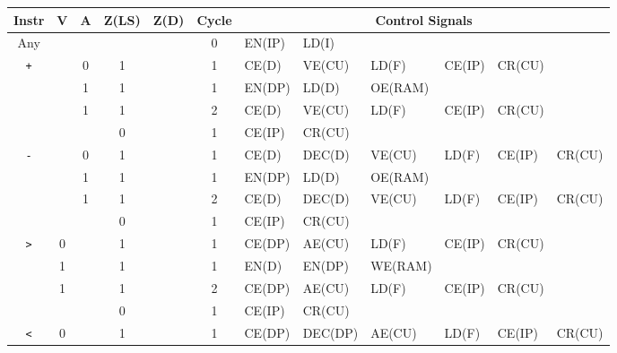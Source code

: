 \begin{landscape}
  \begin{longtable}[c] {c|cccc|c|llllll}
                     Instr        & V & A & Z(LS) & Z(D) & Cycle & \multicolumn{6}{c}{Control Signals}                      \\ \hline
    \rowcolor{White} Any          &   &   &       &      & 0     & EN(IP)   & LD(I)    &         &        &        &        \\ \hline
    \rowcolor{Gray}  \texttt{+}   &   & 0 & 1     &      & 1     & CE(D)    & VE(CU)   & LD(F)   & CE(IP) & CR(CU) &        \\
    \rowcolor{White}              &   & 1 & 1     &      & 1     & EN(DP)   & LD(D)    & OE(RAM) &        &        &        \\
    \rowcolor{White}              &   & 1 & 1     &      & 2     & CE(D)    & VE(CU)   & LD(F)   & CE(IP) & CR(CU) &        \\
    \rowcolor{Gray}               &   &   & 0     &      & 1     & CE(IP)   & CR(CU)   &         &        &        &        \\ \hline
    \rowcolor{White} \texttt{-}   &   & 0 & 1     &      & 1     & CE(D)    & DEC(D)   & VE(CU)  & LD(F)  & CE(IP) & CR(CU) \\
    \rowcolor{Gray}               &   & 1 & 1     &      & 1     & EN(DP)   & LD(D)    & OE(RAM) &        &        &        \\
    \rowcolor{Gray}               &   & 1 & 1     &      & 2     & CE(D)    & DEC(D)   & VE(CU)  & LD(F)  & CE(IP) & CR(CU) \\
    \rowcolor{White}              &   &   & 0     &      & 1     & CE(IP)   & CR(CU)   &         &        &        &        \\ \hline
    \rowcolor{Gray}  \texttt{>}   & 0 &   & 1     &      & 1     & CE(DP)   & AE(CU)   & LD(F)   & CE(IP) & CR(CU) &        \\
    \rowcolor{White}              & 1 &   & 1     &      & 1     & EN(D)    & EN(DP)   & WE(RAM) &        &        &        \\
    \rowcolor{White}              & 1 &   & 1     &      & 2     & CE(DP)   & AE(CU)   & LD(F)   & CE(IP) & CR(CU) &        \\
    \rowcolor{Gray}               &   &   & 0     &      & 1     & CE(IP)   & CR(CU)   &         &        &        &        \\ \hline
    \rowcolor{White} \texttt{<}   & 0 &   & 1     &      & 1     & CE(DP)   & DEC(DP)  & AE(CU)  & LD(F)  & CE(IP) & CR(CU) \\

\end{longtable}
\end{landscape}

